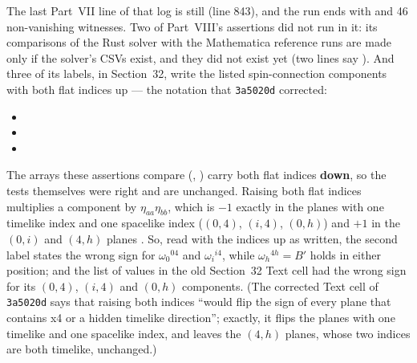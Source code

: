 The last Part~VII line of that log is still 
(line 843), and the run ends with  and 46
non-vanishing witnesses. Two of Part~VIII's assertions did not run in it: its comparisons of the Rust
solver with the Mathematica reference runs are made only if the solver's CSVs exist, and they did not
exist yet (two  lines say ).
And three of its labels, in Section~32, write the listed spin-connection components with both flat
indices up --- the notation that \texttt{3a5020d} corrected:
\begin{itemize}
  \item {}
  \item {}
  \item {}
\end{itemize}
The arrays these assertions compare (, ) carry both flat indices
\textbf{down}, so the tests themselves were right and are unchanged. Raising both flat indices
multiplies a component by $\eta_{aa}\eta_{bb}$, which is $-1$ exactly in the planes with one timelike
index and one spacelike index ($(0,4)$, $(i,4)$, $(0,h)$) and $+1$ in the $(0,i)$ and $(4,h)$ planes
\cfderived. So, read with the indices up as written, the second label states the wrong sign for
$\omega_0{}^{04}$ and $\omega_i{}^{i4}$, while $\omega_h{}^{4h}=B'$ holds in either position; and the
list of values in the old Section~32 Text cell had the wrong sign for its $(0,4)$, $(i,4)$ and $(0,h)$
components. (The corrected Text cell of \texttt{3a5020d} says that raising both indices ``would flip
the sign of every plane that contains x4 or a hidden timelike direction''; exactly, it flips the
planes with one timelike and one spacelike index, and leaves the $(4,h)$ planes, whose two indices are
both timelike, unchanged.)

